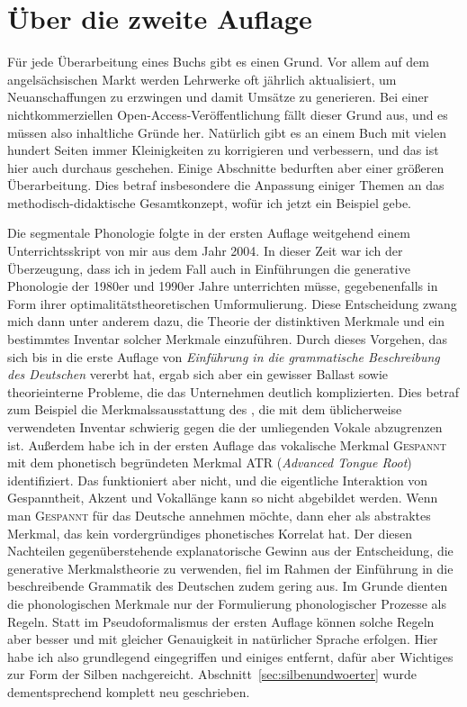 \section*{Über die zweite Auflage}

Für jede Überarbeitung eines Buchs gibt es einen Grund.
Vor allem auf dem angelsächsischen Markt werden Lehrwerke oft jährlich aktualisiert, um Neuanschaffungen zu erzwingen und damit Umsätze zu generieren.
Bei einer nichtkommerziellen Open-Access-Veröffentlichung fällt dieser Grund aus, und es müssen also inhaltliche Gründe her.
Natürlich gibt es an einem Buch mit vielen hundert Seiten immer Kleinigkeiten zu korrigieren und verbessern, und das ist hier auch durchaus geschehen.
Einige Abschnitte bedurften aber einer größeren Überarbeitung.
Dies betraf insbesondere die Anpassung einiger Themen an das methodisch-didaktische Gesamtkonzept, wofür ich jetzt ein Beispiel gebe.

Die segmentale Phonologie folgte in der ersten Auflage weitgehend einem Unterrichtsskript von mir aus dem Jahr 2004.
In dieser Zeit war ich der Überzeugung, dass ich in jedem Fall auch in Einführungen die generative Phonologie der 1980er und 1990er Jahre unterrichten müsse, gegebenenfalls in Form ihrer optimalitätstheoretischen Umformulierung.
Diese Entscheidung zwang mich dann unter anderem dazu, die Theorie der distinktiven Merkmale und ein bestimmtes Inventar solcher Merkmale einzuführen.
Durch dieses Vorgehen, das sich bis in die erste Auflage von \textit{Einführung in die grammatische Beschreibung des Deutschen} vererbt hat, ergab sich aber ein gewisser Ballast sowie theorieinterne Probleme, die das Unternehmen deutlich komplizierten.
Dies betraf zum Beispiel die Merkmalssausstattung des \textipa{[5]}, die mit dem üblicherweise verwendeten Inventar schwierig gegen die der umliegenden Vokale abzugrenzen ist.
Außerdem habe ich in der ersten Auflage das vokalische Merkmal \textsc{Gespannt} mit dem phonetisch begründeten Merkmal ATR (\textit{Advanced Tongue Root}) identifiziert.
Das funktioniert aber nicht, und die eigentliche Interaktion von Gespanntheit, Akzent und Vokallänge kann so nicht abgebildet werden.
Wenn man \textsc{Gespannt} für das Deutsche annehmen möchte, dann eher als abstraktes Merkmal, das kein vordergründiges phonetisches Korrelat hat.
Der diesen Nachteilen gegenüberstehende explanatorische Gewinn aus der Entscheidung, die generative Merkmalstheorie zu verwenden, fiel im Rahmen der Einführung in die beschreibende Grammatik des Deutschen zudem gering aus.
Im Grunde dienten die phonologischen Merkmale nur der Formulierung phonologischer Prozesse als Regeln.
Statt im Pseudoformalismus der ersten Auflage können solche Regeln aber besser und mit gleicher Genauigkeit in natürlicher Sprache erfolgen.
Hier habe ich also grundlegend eingegriffen und einiges entfernt, dafür aber Wichtiges zur Form der Silben nachgereicht.
Abschnitt~\ref{sec:silbenundwoerter} wurde dementsprechend komplett neu geschrieben.

